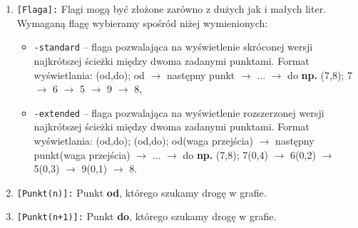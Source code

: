 \documentclass[10pt, a4paper]{report}
\begin{document}
\begin{enumerate}
    \item \texttt{[Flaga]:}
    \newline Flagi mogą być złożone zarówno z dużych jak i małych liter. Wymaganą flagę wybieramy spośród niżej wymienionych:
    \begin{itemize}
        \item \texttt{-standard} – flaga pozwalająca na wyświetlenie skróconej wersji najkrótszej ścieżki między dwoma zadanymi punktami.
        \newline Format wyświetlania: (od,do); od $\rightarrow$ następny punkt $\rightarrow$ ... $\rightarrow$ do
        \newline \textbf{np.}
        \newline(7,8); 7 $\rightarrow$ 6 $\rightarrow$ 5 $\rightarrow$ 9 $\rightarrow$ 8,
        \item \texttt{-extended} -- flaga pozwalająca na wyświetlenie rozszerzonej wersji najkrótszej ścieżki między dwoma zadanymi punktami.
        \newline Format wyświetlania: (od,do); (od,do); od(waga przejścia) $\rightarrow$ następny punkt(waga przejścia) $\rightarrow$ ... $\rightarrow$ do
        \newline \textbf{np.}
        \newline (7,8); 7(0,4) $\rightarrow$ 6(0,2) $\rightarrow$ 5(0,3) $\rightarrow$ 9(0,1) $\rightarrow$ 8.
    \end{itemize}

    \item \texttt{[Punkt(n)]:}
    \newline Punkt \textbf{od}, którego szukamy drogę w grafie.

    \item \texttt{[Punkt(n+1)]:}
    \newline Punkt \textbf{do}, którego szukamy drogę w grafie.
\end{enumerate}
\end{document}
